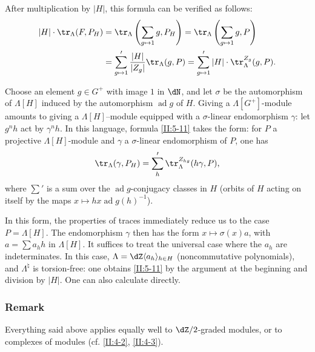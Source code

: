 After multiplication by $|H|$, this formula can be verified as follows:
\begin{align*}
  |H|\cdot \tr_\Lambda(F,P_H) &= \tr_\Lambda\left(\sum_{g\mapsto 1} g,P_H\right) = \tr_\Lambda\left(\sum_{g\mapsto 1} g,P\right) \\
  &= \sum_{g\mapsto 1}' \frac{|H|}{|Z_g|}\tr_\Lambda(g,P) = \sum_{g\mapsto 1}' |H|\cdot \tr_\Lambda^{Z_g}(g,P) \text{.}
\end{align*}

Choose an element $g\in G^+$ with image $1$ in $\dN$, and let $\sigma$ be
the automorphism of $\Lambda[H]$ induced by the automorphism
$\operatorname{ad} g$ of $H$. Giving a $\Lambda[G^+]$-module amounts to
giving a $\Lambda[H]$--module equipped with a $\sigma$-linear endomorphism
$\gamma$: let $g^n h$ act by $\gamma^n h$. In this language, formula
\ref{II:5-11} takes the form: for $P$ a projective $\Lambda[H]$-module and
$\gamma$ a $\sigma$-linear endomorphism of $P$, one has
\[
  \tr_\Lambda(\gamma,P_H) = \sum_h' \tr_\Lambda^{Z_{hg}}(h\gamma,P)\text{,}
\]
where $\sum'$ is a sum over the $\operatorname{ad}g$-conjugacy classes in
$H$ (orbits of $H$ acting on itself by the maps
$x\mapsto h x \operatorname{ad} g(h)^{-1}$).

In this form, the properties of traces immediately reduce us to the case
$P=\Lambda[H]$. The endomorphism $\gamma$ then has the form
$x\mapsto \sigma(x) a$, with $a=\sum a_h h$ in $\Lambda[H]$. It suffices to
treat the universal case where the $a_h$ are indeterminates. In this case,
$\Lambda=\dZ\langle a_h\rangle_{h\in H}$ (noncommutative polynomials), and
$\Lambda^\natural$ is torsion-free: one obtains \ref{II:5-11} by the
argument at the beginning and division by $|H|$. One can also calculate
directly.






\subsubsection{Remark}\label{II:5-11-1}

Everything said above applies equally well to $\dZ/2$-graded modules, or to
complexes of modules (cf. \ref{II:4-2}, \ref{II:4-3}).






\subsection{}\label{II:5-12}

